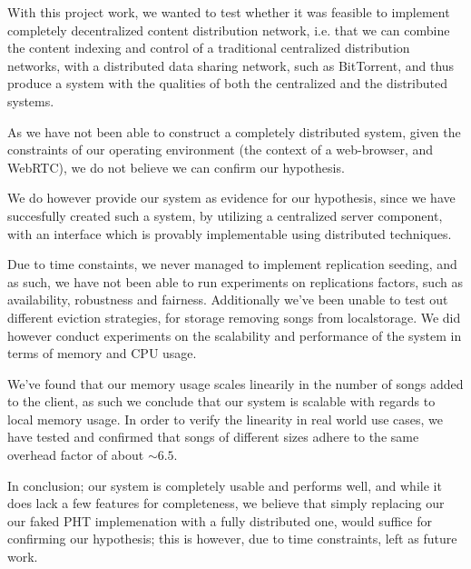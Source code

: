 With this project work, we wanted to test whether it was feasible to implement
completely decentralized content distribution network, i.e. that we can combine
the content indexing and control of a traditional centralized distribution networks, 
with a distributed data sharing network, such as BitTorrent, 
and thus produce a system
with the qualities of both the centralized and the distributed systems.
\newline\newline

As we have not been able to construct a completely distributed system,
given the constraints of our operating environment
(the context of a web-browser, and WebRTC),
we do not believe we can confirm our hypothesis.

We do however provide our system as evidence for our hypothesis, since we have
succesfully created such a system, by utilizing a centralized server component,
with an interface which is provably implementable using distributed techniques.
\newline\newline

Due to time constaints, 
we never managed to implement replication seeding, 
and as such,
we have not been able to run experiments on replications factors,
such as availability, robustness and fairness.
Additionally we've been unable to test out different eviction strategies,
for storage removing songs from localstorage.
\newline\newline
We did however conduct experiments on the scalability and performance of the 
system in terms of memory and CPU usage.

We've found that our memory usage scales linearily in the number of songs added
to the client, as such we conclude that our system is scalable with regards to
local memory usage. In order to verify the linearity in real world use cases,
we have tested and confirmed that songs of different sizes adhere to the same
overhead factor of about $\sim6.5$.
\newline\newline

In conclusion; our system is completely usable and performs well,
and while it does lack a few features for completeness,
we believe that simply replacing our our faked \acs{PHT}
implemenation with a fully distributed one,
would suffice for confirming our hypothesis; 
this is however, due to time constraints, left as future work.
